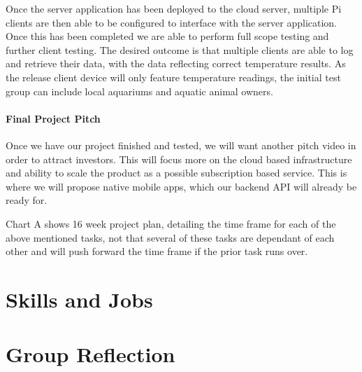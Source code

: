 \documentclass[11pt, oneside, a4paper, titlepage]{article}
\begin{document}
Once the server application has been deployed to the cloud server, multiple Pi clients are then able to be configured to interface with the server application. Once this has been completed we are able to perform full scope testing and further client testing. The desired outcome is that multiple clients are able to log and retrieve their data, with the data reflecting correct temperature results. As the release client device will only feature temperature readings, the initial test group can include local aquariums and aquatic animal owners. 

\subsection{Final Project Pitch}
Once we have our project finished and tested, we will want another pitch video in order to attract investors.  This will focus more on the cloud based infrastructure and ability to scale the product as a possible subscription based service.  This is where we will propose native mobile apps, which our backend API will already be ready for.  

Chart A shows 16 week project plan, detailing the time frame for each of the above mentioned tasks, not that several of these tasks are dependant of each other and will push forward the time frame if the prior task runs over. 



\part{Skills and Jobs}


\part{Group Reflection}
\end{document}
